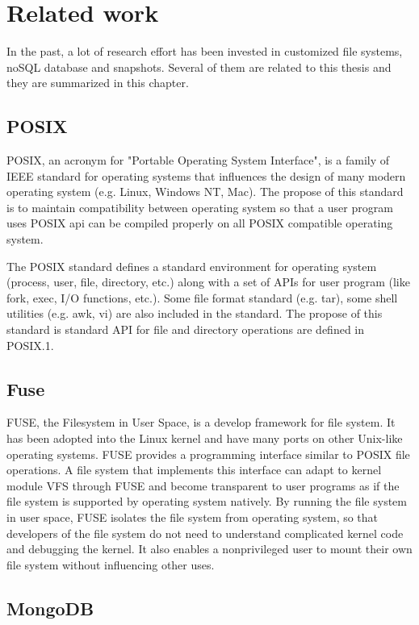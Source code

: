 \chapter{Related work}
\label{chap-two}

    In the past, a lot of research eﬀort has been invested in customized file systems, noSQL database and snapshots. Several of them are related to this thesis and they are summarized in this chapter.

\section{POSIX}

    POSIX, an acronym for "Portable Operating System Interface", is a family of IEEE standard for operating systems that influences the design of many modern operating system (e.g. Linux, Windows NT, Mac). The propose of this standard is to maintain compatibility between operating system so that a user program uses POSIX api can be compiled properly on all POSIX compatible operating system.

    The POSIX standard defines a standard environment for operating system (process, user, file, directory, etc.) along with a set of APIs for user program (like fork, exec, I/O functions, etc.). Some file format standard (e.g. tar), some shell utilities (e.g. awk, vi) are also included in the standard. The propose of this standard is standard API for file and directory operations are defined in POSIX.1. 

\section{Fuse}

	FUSE, the Filesystem in User Space, is a develop framework for file system.  It has been adopted into the Linux kernel and have many ports on other Unix-like operating systems. FUSE provides a programming interface similar to POSIX file operations. A file system that implements this interface can adapt to kernel module VFS through FUSE and become transparent to user programs as if the file system is supported by operating system natively. By running the file system in user space, FUSE isolates the file system from operating system, so that developers of the file system do not need to understand complicated kernel code and debugging the kernel. It also enables a nonprivileged user to mount their own file system without influencing other uses.

\section{MongoDB}

